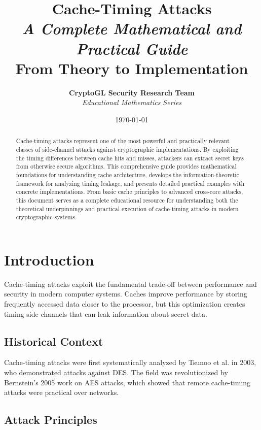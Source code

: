 \documentclass[11pt,a4paper]{article}
\title{
    \Huge\textbf{Cache-Timing Attacks} \\
    \Large\textit{A Complete Mathematical and Practical Guide} \\
    \large From Theory to Implementation
}
\author{
    \textbf{CryptoGL Security Research Team} \\
    \textit{Educational Mathematics Series}
}
\date{\today}
\theoremstyle{definition}
\begin{document}
\maketitle

\begin{abstract}
Cache-timing attacks represent one of the most powerful and practically relevant classes of side-channel attacks against cryptographic implementations. By exploiting the timing differences between cache hits and misses, attackers can extract secret keys from otherwise secure algorithms. This comprehensive guide provides mathematical foundations for understanding cache architecture, develops the information-theoretic framework for analyzing timing leakage, and presents detailed practical examples with concrete implementations. From basic cache principles to advanced cross-core attacks, this document serves as a complete educational resource for understanding both the theoretical underpinnings and practical execution of cache-timing attacks in modern cryptographic systems.
\end{abstract}

\tableofcontents
\newpage

\section{Introduction}

Cache-timing attacks exploit the fundamental trade-off between performance and security in modern computer systems. Caches improve performance by storing frequently accessed data closer to the processor, but this optimization creates timing side channels that can leak information about secret data.

\subsection{Historical Context}

Cache-timing attacks were first systematically analyzed by Tsunoo et al. \cite{tsunoo2003cryptanalysis} in 2003, who demonstrated attacks against DES. The field was revolutionized by Bernstein's 2005 work \cite{bernstein2005cache} on AES attacks, which showed that remote cache-timing attacks were practical over networks.

\subsection{Attack Principles}
\end{document}
